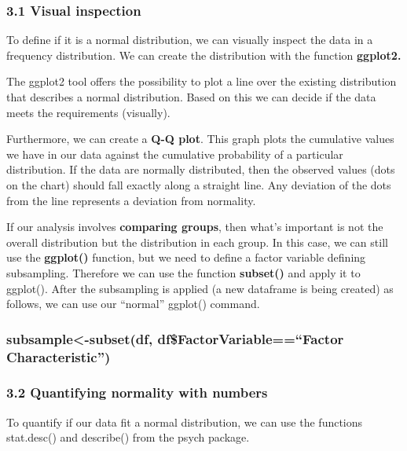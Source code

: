 \documentclass[
]{article}
\begin{document}
\hypertarget{visual-inspection}{%
\subsubsection{3.1 Visual inspection}\label{visual-inspection}}

To define if it is a normal distribution, we can visually inspect the
data in a frequency distribution. We can create the distribution with
the function \textbf{ggplot2.}

The ggplot2 tool offers the possibility to plot a line over the existing
distribution that describes a normal distribution. Based on this we can
decide if the data meets the requirements (visually).

Furthermore, we can create a \textbf{Q-Q plot}. This graph plots the
cumulative values we have in our data against the cumulative probability
of a particular distribution. If the data are normally distributed, then
the observed values (dots on the chart) should fall exactly along a
straight line. Any deviation of the dots from the line represents a
deviation from normality.

If our analysis involves \textbf{comparing groups}, then what's
important is not the overall distribution but the distribution in each
group. In this case, we can still use the \textbf{ggplot()} function,
but we need to define a factor variable defining subsampling. Therefore
we can use the function \textbf{subset()} and apply it to ggplot().
After the subsampling is applied (a new dataframe is being created) as
follows, we can use our ``normal'' ggplot() command.

\hypertarget{subsample-subsetdf-dffactorvariablefactor-characteristic}{%
\subsubsection{subsample\textless-subset(df,
df\$FactorVariable==``Factor
Characteristic'')}\label{subsample-subsetdf-dffactorvariablefactor-characteristic}}

\hypertarget{quantifying-normality-with-numbers}{%
\subsubsection{3.2 Quantifying normality with
numbers}\label{quantifying-normality-with-numbers}}

To quantify if our data fit a normal distribution, we can use the
functions stat.desc() and describe() from the psych package.
\end{document}
